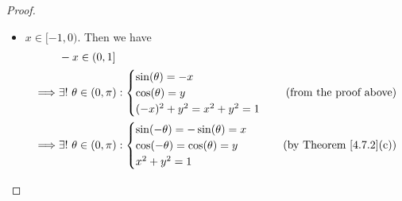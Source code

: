 \begin{proof}
\begin{itemize}
\begin{align*}
              \end{align*}
              Using similar arguments we can show that \(\cos\big([\frac{\pi}{2}, \pi)\big) \subseteq (-1, 0]\).
              Thus we have
              \begin{align*}
                   & \big(x \in (0, 1]\big) \land \big(y \in [0, 1)\big) \implies \exists\ \theta_1 \in (0, \frac{\pi}{2}] : \big(\sin(\theta_1) = x\big) \land \big(\cos(\theta_1) = y\big);    \\
                   & \big(x \in (0, 1]\big) \land \big(y \in (-1, 0]\big) \implies \exists\ \theta_2 \in [\frac{\pi}{2}, \pi) : \big(\sin(\theta_2) = x\big) \land \big(\cos(\theta_2) = y\big).
              \end{align*}
              But \(\cos\) is strictly decreasing on \((0, \pi)\) implies the choices of \(\theta_1\) and \(\theta_2\) are unique.
              And we conclude that
              \[
                  \forall\ x \in (0, 1], \exists!\ \theta \in (0, \pi) : \begin{cases}
                      \sin(\theta) = x \\
                      \cos(\theta) = y \\
                      x^2 + y^2 = 1
                  \end{cases}
              \]
        \item \(x \in [-1, 0)\).
              Then we have
              \begin{align*}
                           & -x \in (0, 1]                                                                                    \\
                  \implies & \exists!\ \theta \in (0, \pi) : \begin{cases}
                      \sin(\theta) = -x \\
                      \cos(\theta) = y  \\
                      (-x)^2 + y^2 = x^2 + y^2 = 1
                  \end{cases}  & \text{(from the proof above)}      \\
                  \implies & \exists!\ \theta \in (0, \pi) : \begin{cases}
                      \sin(-\theta) = -\sin(\theta) = x \\
                      \cos(-\theta) = \cos(\theta) = y  \\
                      x^2 + y^2 = 1
                  \end{cases}  & \text{(by Theorem \ref{4.7.2}(c))} \\

\end{align*}
\end{itemize}
\end{proof}
